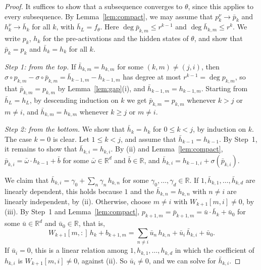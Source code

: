 \documentclass[11pt]{article}
\theoremstyle{definition}
\theoremstyle{remark}
\newcommand{\R}{\mathbb{R}}
\begin{document}
\begin{proof}
It suffices to show that a subsequence converges to $\theta$, since this applies to every subsequence. By Lemma~\ref{lem:compact}, we may assume that $p^\nu_k\to\bar p_k$ and $h^\nu_k\to\bar h_k$ for all $k$, with $\bar h_L=f_\theta$. Here $\deg\bar p_{k,m}\le r^{k-1}$ and $\deg\bar h_{k,m}\le r^k$. We write $p_k$, $h_k$ for the pre-activations and the hidden states of $\theta$, and show that $\bar p_k=p_k$ and $\bar h_k=h_k$ for all $k$.

\emph{Step 1: from the top.} If $\bar h_{k,m}=h_{k,m}$ for some $(k,m)\ne(j,i)$, then $\sigma\circ p_{k,m}-\sigma\circ\bar p_{k,m}=\bar h_{k-1,m}-h_{k-1,m}$ has degree at most $r^{k-1}=\deg p_{k,m}$, so that $\bar p_{k,m}=p_{k,m}$ by Lemma~\ref{lem:gap}(i), and $\bar h_{k-1,m}=h_{k-1,m}$. Starting from $\bar h_L=h_L$, by descending induction on $k$ we get $\bar p_{k,m}=p_{k,m}$ whenever $k>j$ or $m\ne i$, and $\bar h_{k,m}=h_{k,m}$ whenever $k\ge j$ or $m\ne i$.

\emph{Step 2: from the bottom.} We show that $\bar h_k=h_k$ for $0\le k<j$, by induction on $k$. The case $k=0$ is clear. Let $1\le k<j$, and assume that $\bar h_{k-1}=h_{k-1}$. By Step~1, it remains to show that $\bar h_{k,i}=h_{k,i}$. By (ii) and Lemma~\ref{lem:compact}, $\bar p_{k,i}=\bar\omega\cdot h_{k-1}+\bar b$ for some $\bar\omega\in\R^d$ and $\bar b\in\R$, and $\bar h_{k,i}=h_{k-1,i}+\sigma(\bar p_{k,i})$.

We claim that $\bar h_{k,i}=\gamma_0+\sum_n\gamma_n\,h_{k,n}$ for some $\gamma_0,\dots,\gamma_d\in\R$. If $1,\bar h_{k,1},\dots,\bar h_{k,d}$ are linearly dependent, this holds because $1$ and the $\bar h_{k,n}=h_{k,n}$ with $n\ne i$ are linearly independent, by (ii). Otherwise, choose $m\ne i$ with $W_{k+1}[m,i]\ne0$, by (iii). By Step~1 and Lemma~\ref{lem:compact}, $p_{k+1,m}=\bar p_{k+1,m}=\bar u\cdot\bar h_k+\bar u_0$ for some $\bar u\in\R^d$ and $\bar u_0\in\R$, that is,
\[
W_{k+1}[m,:]\,h_k+b_{k+1,m}=\sum_{n\ne i}\bar u_n\,h_{k,n}+\bar u_i\,\bar h_{k,i}+\bar u_0.
\]
If $\bar u_i=0$, this is a linear relation among $1,h_{k,1},\dots,h_{k,d}$ in which the coefficient of $h_{k,i}$ is $W_{k+1}[m,i]\ne0$, against (ii). So $\bar u_i\ne0$, and we can solve for $\bar h_{k,i}$.


\end{proof}
\end{document}
